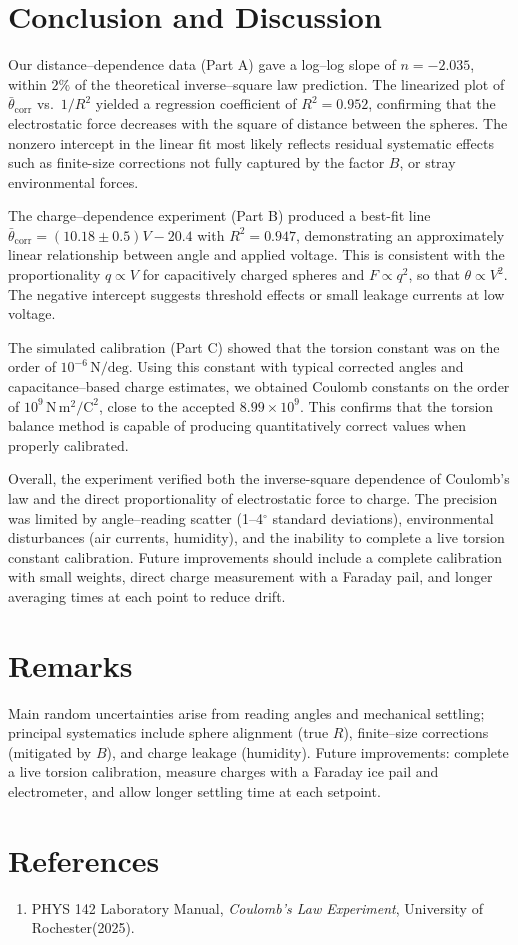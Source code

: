 \documentclass[12pt]{article}
\begin{document}
\section*{Conclusion and Discussion}

Our distance–dependence data (Part A) gave a log–log slope of $n=-2.035$, within $2\%$ of the theoretical inverse–square law prediction. The linearized plot of $\bar{\theta}_{\mathrm{corr}}$ vs.\ $1/R^2$ yielded a regression coefficient of $R^2=0.952$, confirming that the electrostatic force decreases with the square of distance between the spheres. The nonzero intercept in the linear fit most likely reflects residual systematic effects such as finite-size corrections not fully captured by the factor $B$, or stray environmental forces.

The charge–dependence experiment (Part B) produced a best-fit line $\bar{\theta}_{\mathrm{corr}}=(10.18\pm0.5)V-20.4$ with $R^2=0.947$, demonstrating an approximately linear relationship between angle and applied voltage. This is consistent with the proportionality $q\propto V$ for capacitively charged spheres and $F\propto q^2$, so that $\theta\propto V^2$. The negative intercept suggests threshold effects or small leakage currents at low voltage.

The simulated calibration (Part C) showed that the torsion constant was on the order of $10^{-6}\,\mathrm{N/deg}$. Using this constant with typical corrected angles and capacitance–based charge estimates, we obtained Coulomb constants on the order of $10^9\,\mathrm{N\,m^2/C^2}$, close to the accepted $8.99\times10^9$. This confirms that the torsion balance method is capable of producing quantitatively correct values when properly calibrated.

Overall, the experiment verified both the inverse-square dependence of Coulomb’s law and the direct proportionality of electrostatic force to charge. The precision was limited by angle–reading scatter (1–4$^\circ$ standard deviations), environmental disturbances (air currents, humidity), and the inability to complete a live torsion constant calibration. Future improvements should include a complete calibration with small weights, direct charge measurement with a Faraday pail, and longer averaging times at each point to reduce drift.


\section*{Remarks}
Main random uncertainties arise from reading angles and mechanical settling; principal systematics include sphere alignment (true $R$), finite--size corrections (mitigated by $B$), and charge leakage (humidity). Future improvements: complete a live torsion calibration, measure charges with a Faraday ice pail and electrometer, and allow longer settling time at each setpoint.

\section*{References}
\begin{enumerate}
\item PHYS 142 Laboratory Manual, \emph{Coulomb’s Law Experiment}, University of Rochester(2025).
\end{enumerate}
\end{document}
